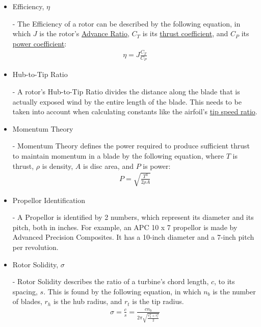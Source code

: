 \documentclass{article}
\begin{document}
\begin{itemize}
	\item \hypertarget{eta}{Efficiency, $\eta$} - The Efficiency of a rotor can be described by the following equation, in which $J$ is the rotor's \hyperlink{J}{Advance Ratio}, $C_{T}$ is its \hyperlink{CT}{thrust coefficient}, and $C_{P}$ its \hyperlink{CP}{power coefficient}:
	\begin{equation}
	\begin{aligned}
		\eta = J \frac{C_{T}}{C_{P}}
	\end{aligned}
	\end{equation}
	
	\item \hypertarget{D/D}{Hub-to-Tip Ratio} - A rotor's Hub-to-Tip Ratio divides the distance along the blade that is actually exposed wind by the entire length of the blade. This needs to be taken into account when calculating constants like the airfoil's \hyperlink{lambda}{tip speed ratio}.
	
	\item \hypertarget{MT}{Momentum Theory} - Momentum Theory defines the power required to produce sufficient thrust to maintain momentum in a blade by the following equation, where $T$ is thrust, $\rho$ is density, $A$ is disc area, and $P$ is power:
	\begin{equation}
	\begin{aligned}
        		P = \sqrt{\frac{T^{3}}{2 \rho A}}
	\end{aligned}
	\end{equation}
	
	\item \hypertarget{APC}{Propellor Identification} - A Propellor is identified by 2 numbers, which represent its diameter and its pitch, both in inches. For example, an APC 10 x 7 propellor is made by Advanced Precision Composites. It has a 10-inch diameter and a 7-inch pitch per revolution.
	
	\item \hypertarget{sigma}{Rotor Solidity, $\sigma$} - Rotor Solidity describes the ratio of a turbine's chord length, $c$, to its spacing, $s$. This is found by the following equation, in which $n_{b}$ is the number of blades, $r_{h}$ is the hub radius, and $r_{t}$ is the tip radius.
	\begin{equation}
	\begin{aligned}
		\sigma = \frac{c}{s} = \frac{c n_{b}}{2 \pi \sqrt{\frac{r^{2}_{h} + r^{2}_{t}}{2}}}
	\end{aligned}
	\end{equation}
	

\end{itemize}
\end{document}
